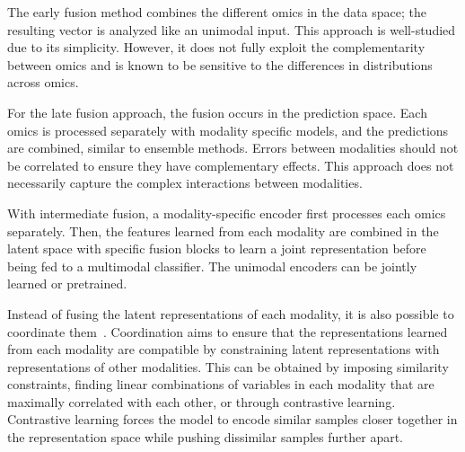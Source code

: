 \documentclass[../main.tex]{subfiles}
\begin{document}
	\begin{description}[%
			style=multiline,
			leftmargin=!,
			labelwidth=2.5cm,
		]
		\item[Early fusion]
			The early fusion method combines the different omics in the data space; the resulting vector is analyzed like an unimodal input.
			This approach is well-studied due to its simplicity.
			However, it does not fully exploit the complementarity between omics and is known to be sensitive to the differences in distributions across omics.
		\item[Late fusion]
			For the late fusion approach, the fusion occurs in the prediction space.
			Each omics is processed separately with modality specific models, and the predictions are combined, similar to ensemble methods.
			Errors between modalities should not be correlated to ensure they have complementary effects.
			This approach does not necessarily capture the complex interactions between modalities.
		\item[Intermediate fusion]
			With intermediate fusion, a modality-specific encoder first processes each omics separately.
			Then, the features learned from each modality are combined in the latent space with specific fusion blocks to learn a joint representation before being fed to a multimodal classifier.
			The unimodal encoders can be jointly learned or pretrained.
	\end{description}
	Instead of fusing the latent representations of each modality, it is also possible to coordinate them~\cite{MML_morency}.
	Coordination aims to ensure that the representations learned from each modality are compatible by constraining latent representations with representations of other modalities.
	This can be obtained by imposing similarity constraints, finding linear combinations of variables in each modality that are maximally correlated with each other, or through contrastive learning.
	Contrastive learning forces the model to encode similar samples closer together in the representation space while pushing dissimilar samples further apart.
\end{document}
